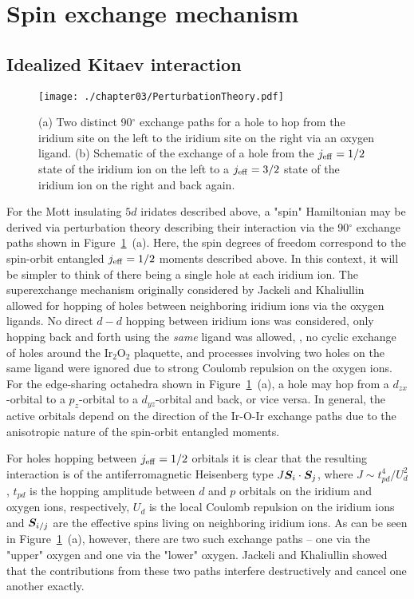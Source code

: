 \section{Spin exchange mechanism}
\label{section:chapter03_SpinExchange}
%
%
\subsection{Idealized Kitaev interaction}
%
%
%
\begin{figure}[tb]
	\centering
	\texttt{[image: ./chapter03/PerturbationTheory.pdf]}
	\caption{
		(a) Two distinct 90$^{\circ}$ exchange paths for a hole to hop from the iridium site on the left to the iridium site on the right via an oxygen ligand.
		(b) Schematic of the exchange of a hole from the $j_{\rm eff} = 1/2$ state of the iridium ion on the left to a $j_{\rm eff} = 3/2$ state of the iridium ion on the right and back again.
	}
	\label{fig:chapter03_ExchangePaths}
\end{figure}
%
For the Mott insulating $5d$ iridates described above, a "spin" Hamiltonian may be derived via perturbation theory describing their interaction via the 90$^{\circ}$ exchange paths shown in Figure~\ref{fig:chapter03_ExchangePaths}~(a).
Here, the spin degrees of freedom correspond to the spin-orbit entangled $j_{\rm eff} = 1/2$ moments described above.
In this context, it will be simpler to think of there being a single hole at each iridium ion.
The superexchange mechanism originally considered by Jackeli and Khaliullin~\cite{JackeliPRL2009} allowed for hopping of holes between neighboring iridium ions via the oxygen ligands.
No direct $d-d$ hopping between iridium ions was considered, only hopping back and forth using the \textit{same} ligand was allowed, \ie, no cyclic exchange of holes around the Ir$_2$O$_2$ plaquette, and processes involving two holes on the same ligand were ignored due to strong Coulomb repulsion on the oxygen ions.
For the edge-sharing octahedra shown in Figure~\ref{fig:chapter03_ExchangePaths}~(a), a hole may hop from a $d_{zx}$-orbital to a $p_z$-orbital to a $d_{yz}$-orbital and back, or vice versa. 
In general, the active orbitals depend on the direction of the Ir-O-Ir exchange paths due to the anisotropic nature of the spin-orbit entangled moments.

For holes hopping between $j_{\rm eff} = 1/2$ orbitals it is clear that the resulting interaction is of the antiferromagnetic Heisenberg type $J \bm{S}_i \cdot \bm{S}_j$, where $J \sim t_{pd}^4 / U_d^2$, $t_{pd}$ is the hopping amplitude between $d$ and $p$ orbitals on the iridium and oxygen ions, respectively, $U_d$ is the local Coulomb repulsion on the iridium ions and $\bm{S}_{i/j}$ are the effective spins living on neighboring iridium ions.
As can be seen in Figure~\ref{fig:chapter03_ExchangePaths}~(a), however, there are two such exchange paths -- one via the "upper" oxygen and one via the "lower" oxygen.
Jackeli and Khaliullin showed that the contributions from these two paths interfere destructively and cancel one another exactly.

